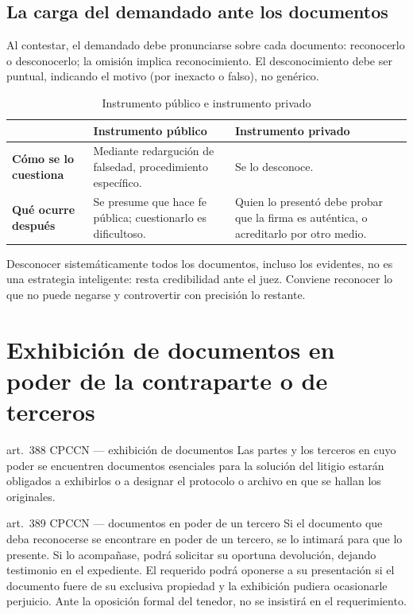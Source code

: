 \documentclass[12pt,oneside]{book}
\begin{document}
\subsection{La carga del demandado ante los documentos}

Al contestar, el demandado debe pronunciarse sobre cada documento: reconocerlo o desconocerlo; la omisión implica reconocimiento. El desconocimiento debe ser puntual, indicando el motivo (por inexacto o falso), no genérico.

\begin{table}[H]
\centering
\caption{Instrumento público e instrumento privado}
\begin{tabularx}{\textwidth}{>{\raggedright\arraybackslash\bfseries}p{} X X}
\toprule
 & Instrumento público & Instrumento privado \\
\midrule
Cómo se lo cuestiona & Mediante redargución de falsedad, procedimiento específico. & Se lo desconoce. \\
Qué ocurre después & Se presume que hace fe pública; cuestionarlo es dificultoso. & Quien lo presentó debe probar que la firma es auténtica, o acreditarlo por otro medio. \\
\bottomrule
\end{tabularx}
\end{table}

\begin{importante}
Desconocer sistemáticamente todos los documentos, incluso los evidentes, no es una estrategia inteligente: resta credibilidad ante el juez. Conviene reconocer lo que no puede negarse y controvertir con precisión lo restante.
\end{importante}

\section{Exhibición de documentos en poder de la contraparte o de terceros}

\begin{regla}{art.~388 CPCCN --- exhibición de documentos}
Las partes y los terceros en cuyo poder se encuentren documentos esenciales para la solución del litigio estarán obligados a exhibirlos o a designar el protocolo o archivo en que se hallan los originales.
\end{regla}

\begin{regla}{art.~389 CPCCN --- documentos en poder de un tercero}
Si el documento que deba reconocerse se encontrare en poder de un tercero, se lo intimará para que lo presente. Si lo acompañase, podrá solicitar su oportuna devolución, dejando testimonio en el expediente. El requerido podrá oponerse a su presentación si el documento fuere de su exclusiva propiedad y la exhibición pudiera ocasionarle perjuicio. Ante la oposición formal del tenedor, no se insistirá en el requerimiento.
\end{regla}
\end{document}
